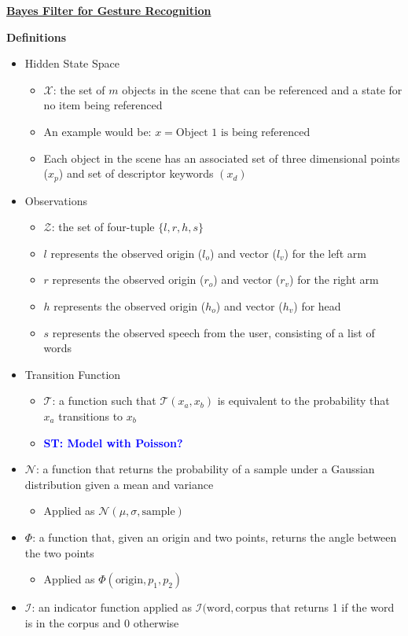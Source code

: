\documentclass[12pt,letterpaper]{article}
\newcommand{\stnote}[1]{\textcolor{Blue}{\textbf{ST: #1}}}
\begin{document}
\begin{center}\textbf{\underline{Bayes Filter for Gesture Recognition}}\end{center}
\textbf{Definitions}
\begin{itemize}
\item{Hidden State Space}
	\begin{itemize}
	\item{$\mathcal{X}$: the set of $m$ objects in the scene that can be referenced and a state for no item being referenced}
	\item{An example would be: $x = \text{Object 1 is being referenced}$}
	\item{Each object in the scene has an associated set of three dimensional points ($x_p$) and set of descriptor keywords $(x_d)$}
	\end{itemize}
\item{Observations}
	\begin{itemize}
	\item{$\mathcal{Z}$: the set of four-tuple $\{l, r, h, s\}$}
	\item{$l$ represents the observed origin ($l_o$) and vector ($l_v$) for the left arm}
	\item{$r$ represents the observed origin  ($r_o$) and vector ($r_v$)  for the right arm}
	\item{$h$ represents the observed origin  ($h_o$) and vector ($h_v$)  for head}
	\item{$s$ represents the observed speech from the user, consisting of a list of words}
	\end{itemize}
\item{Transition Function}
	\begin{itemize}
	\item{$\mathcal{T}$: a function such that $\mathcal{T}(x_a, x_b)$ is equivalent to the probability that $x_a$ transitions to $x_b$}
	\item{\stnote{Model with Poisson?}}
	\end{itemize}
\item{$\mathcal{N}$: a function that returns the probability of a sample under a Gaussian distribution given a mean and variance}
	\begin{itemize}
	\item{Applied as $\mathcal{N}(\mu, \sigma, \text{sample})$}
	\end{itemize}
\item{$\Phi$: a function that, given an origin and two points, returns the angle between the two points}
	\begin{itemize}
	\item{Applied as $\Phi(\text{origin}, p_1, p_2)$}
	\end{itemize}
\item{$\mathcal{I}$: an indicator function applied as $\mathcal{I}(\text{word}, \text{corpus}$ that returns 1 if the word is in the corpus and 0 otherwise}
\end{itemize}
\end{document}
